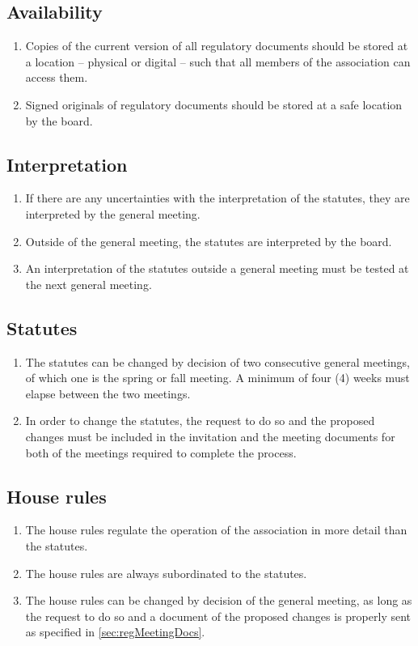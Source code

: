 \subsection{Availability}
\begin{enumerate}
  \item Copies of the current version of all regulatory documents should be stored at a location – physical or digital – such that all members of the association can access them.
  \item Signed originals of regulatory documents should be stored at a safe location by the board.
\end{enumerate}

\subsection{Interpretation}
\begin{enumerate}
  \item If there are any uncertainties with the interpretation of the statutes, they are interpreted by the general meeting.
  \item Outside of the general meeting, the statutes are interpreted by the board.
  \item An interpretation of the statutes outside a general meeting must be tested at the next general meeting.
\end{enumerate}

\subsection{Statutes}
\begin{enumerate}
  \item The statutes can be changed by decision of two consecutive general meetings, of which one is the spring or fall meeting. A minimum of four (4) weeks must elapse between the two meetings.
  \item In order to change the statutes, the request to do so and the proposed changes must be included in the invitation and the meeting documents for both of the meetings required to complete the process.   
\end{enumerate}

\subsection{House rules}
\begin{enumerate}
  \item The house rules regulate the operation of the association in more detail than the statutes. 
  \item The house rules are always subordinated to the statutes.
  \item The house rules can be changed by decision of the general meeting, as long as the request to do so and a document of the proposed changes is properly sent as specified in \ref{sec:regMeetingDocs}.
\end{enumerate}

